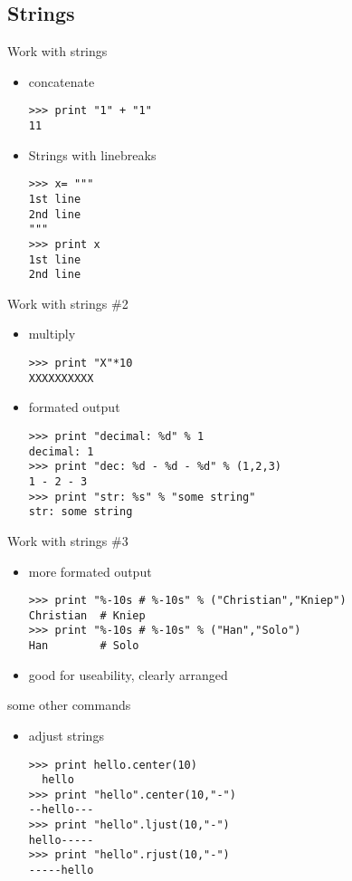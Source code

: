 \documentclass[hyperref={pdfpagelabels=false}]{beamer}
\begin{document}
    \subsection{Strings}
		\begin{frame}[fragile]{Work with strings}
			\begin{itemize}
                \item<1-> concatenate
                \begin{lstlisting}
>>> print "1" + "1"
11
\end{lstlisting}
                \item<2-> Strings with linebreaks
\begin{lstlisting}
>>> x= """
1st line
2nd line
"""
>>> print x
1st line
2nd line
\end{lstlisting}
            \end{itemize}
		\end{frame}
		\begin{frame}[fragile]{Work with strings \#2}
			\begin{itemize}
                \item<1-> multiply
                \begin{lstlisting}
>>> print "X"*10
XXXXXXXXXX
\end{lstlisting}
                \item<2-> formated output
\begin{lstlisting}
>>> print "decimal: %d" % 1
decimal: 1
>>> print "dec: %d - %d - %d" % (1,2,3)
1 - 2 - 3
>>> print "str: %s" % "some string"
str: some string
\end{lstlisting}
            \end{itemize}
		\end{frame}
		\begin{frame}[fragile]{Work with strings \#3}
			\begin{itemize}
                \item<1-> more formated output
\begin{lstlisting}
>>> print "%-10s # %-10s" % ("Christian","Kniep")
Christian  # Kniep
>>> print "%-10s # %-10s" % ("Han","Solo")
Han        # Solo
\end{lstlisting}
            \item<2-> good for useability, clearly arranged
            \end{itemize}
		\end{frame}
		\begin{frame}[fragile]{some other commands}
			\begin{itemize}
                \item<1-> adjust strings
\begin{lstlisting}
>>> print hello.center(10)
  hello
>>> print "hello".center(10,"-")
--hello---
>>> print "hello".ljust(10,"-")
hello-----
>>> print "hello".rjust(10,"-")
-----hello
\end{lstlisting}
            \end{itemize}
		\end{frame}
\end{document}
